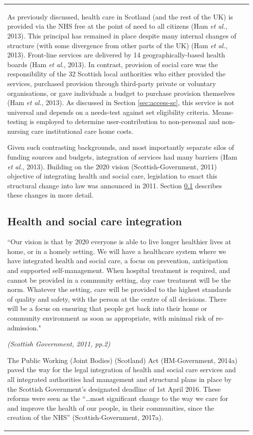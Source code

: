 \documentclass[12pt,a4paper,oneside,table]{report}
\begin{document}
\begin{tabular}[t]{ll}
As previously discussed, health care in Scotland (and the rest of the
UK) is provided via the NHS free at the point of need to all citizens
(Ham \emph{et al.}, 2013). This principal has remained in place despite
many internal changes of structure (with some divergence from other
parts of the UK) (Ham \emph{et al.}, 2013). Front-line services are
delivered by 14 geographically-based health boards (Ham \emph{et al.},
2013). In contrast, provision of social care was the responsibility of
the 32 Scottish local authorities who either provided the services,
purchased provision through third-party private or voluntary
organisations, or gave individuals a budget to purchase provision
themselves (Ham \emph{et al.}, 2013). As discussed in Section
\ref{sec:access-sc}, this service is not universal and depends on a
needs-test against set eligibility criteria. Means-testing is employed
to determine user-contribution to non-personal and non-nursing care
institutional care home costs.

Given such contrasting backgrounds, and most importantly separate silos
of funding sources and budgets, integration of services had many
barriers (Ham \emph{et al.}, 2013). Building on the 2020 vision
(Scottish-Government, 2011) objective of integrating health and social
care, legislation to enact this structural change into law was announced
in 2011. Section \ref{subsec:hsc-integration} describes these changes in
more detail.

\subsection{Health and social care integration}\label{subsec:hsc-integration}

\epigraph{``Our vision is that by 2020 everyone is able to live longer healthier lives at home, or in a homely setting. We will have a healthcare system where we have integrated health and social care, a focus on prevention, anticipation and supported self-management. When hospital treatment is required, and cannot be provided in a community setting, day case treatment will be the norm. Whatever the setting, care will be provided to the highest standards of quality and safety, with the person at the centre of all decisions. There will be a focus on ensuring that people get back into their home or community environment as soon as appropriate, with minimal risk of re-admission."}{\textit{(Scottish Government, 2011, pp.2)}}

The Public Working (Joint Bodies) (Scotland) Act (HM-Government, 2014a)
paved the way for the legal integration of health and social care
services and all integrated authorities had management and structural
plans in place by the Scottish Government's designated deadline of 1st
April 2016. These reforms were seen as the ``\ldots most significant
change to the way we care for and improve the health of our people, in
their communities, since the creation of the NHS'' (Scottish-Government,
2017a).


\end{tabular}
\end{document}
